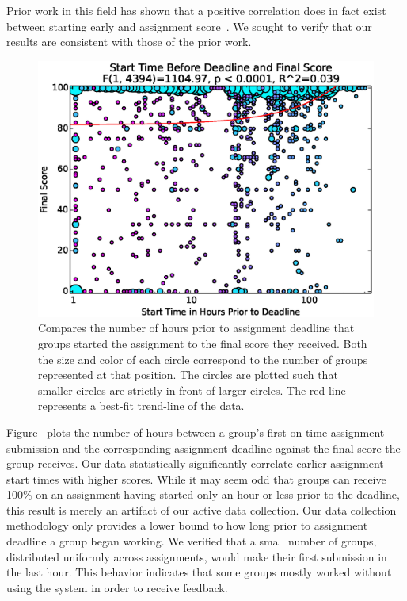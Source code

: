 Prior work in this field has shown that a positive correlation does in fact
exist between starting early and assignment
score~\cite{Spacco:2013:TIP:2462476.2465594,
  Edwards:2009:CEI:1584322.1584325}. We sought to verify that our results are
consistent with those of the prior work.

\begin{figure}[!t]
\centering
\includegraphics[width=5.25in]{graphs/Start_Time_Before_Deadline_and_Final_Score.eps}
\caption{Compares the number of hours prior to assignment deadline that groups
  started the assignment to the final score they received. Both the size and
  color of each circle correspond to the number of groups represented at that
  position. The circles are plotted such that smaller circles are strictly in
  front of larger circles. The red line represents a best-fit trend-line of the
  data.}
\end{figure}

Figure~ plots the number of hours between a
group's first on-time assignment submission and the corresponding assignment
deadline against the final score the group receives. Our data statistically
significantly correlate earlier assignment start times with higher
scores. While it may seem odd that groups can receive 100\% on an assignment
having started only an hour or less prior to the deadline, this result is
merely an artifact of our active data collection. Our data collection
methodology only provides a lower bound to how long prior to assignment
deadline a group began working. We verified that a small number of groups,
distributed uniformly across assignments, would make their first submission in
the last hour. This behavior indicates that some groups mostly worked without
using the system in order to receive feedback.

